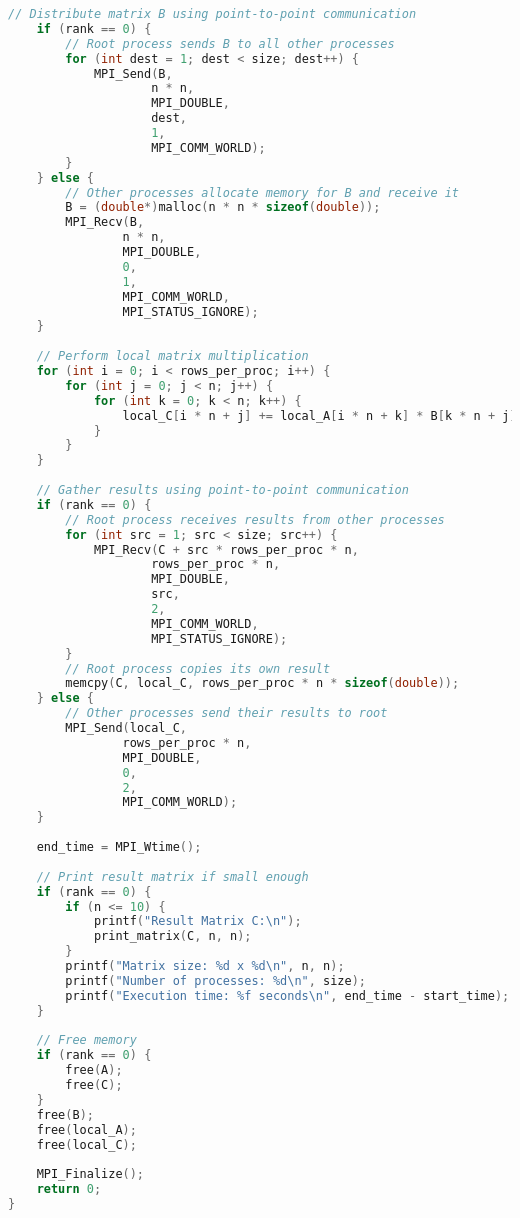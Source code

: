 \documentclass{SYSUReport}
\begin{document}
\begin{lstlisting}[language=C]
    // Distribute matrix B using point-to-point communication
    if (rank == 0) {
        // Root process sends B to all other processes
        for (int dest = 1; dest < size; dest++) {
            MPI_Send(B, 
                    n * n, 
                    MPI_DOUBLE, 
                    dest, 
                    1, 
                    MPI_COMM_WORLD);
        }
    } else {
        // Other processes allocate memory for B and receive it
        B = (double*)malloc(n * n * sizeof(double));
        MPI_Recv(B, 
                n * n, 
                MPI_DOUBLE, 
                0, 
                1, 
                MPI_COMM_WORLD, 
                MPI_STATUS_IGNORE);
    }
    
    // Perform local matrix multiplication
    for (int i = 0; i < rows_per_proc; i++) {
        for (int j = 0; j < n; j++) {
            for (int k = 0; k < n; k++) {
                local_C[i * n + j] += local_A[i * n + k] * B[k * n + j];
            }
        }
    }
    
    // Gather results using point-to-point communication
    if (rank == 0) {
        // Root process receives results from other processes
        for (int src = 1; src < size; src++) {
            MPI_Recv(C + src * rows_per_proc * n, 
                    rows_per_proc * n, 
                    MPI_DOUBLE, 
                    src, 
                    2, 
                    MPI_COMM_WORLD, 
                    MPI_STATUS_IGNORE);
        }
        // Root process copies its own result
        memcpy(C, local_C, rows_per_proc * n * sizeof(double));
    } else {
        // Other processes send their results to root
        MPI_Send(local_C, 
                rows_per_proc * n, 
                MPI_DOUBLE, 
                0, 
                2, 
                MPI_COMM_WORLD);
    }
    
    end_time = MPI_Wtime();
    
    // Print result matrix if small enough
    if (rank == 0) {
        if (n <= 10) {
            printf("Result Matrix C:\n");
            print_matrix(C, n, n);
        }
        printf("Matrix size: %d x %d\n", n, n);
        printf("Number of processes: %d\n", size);
        printf("Execution time: %f seconds\n", end_time - start_time);
    }
    
    // Free memory
    if (rank == 0) {
        free(A);
        free(C);
    }
    free(B);
    free(local_A);
    free(local_C);
    
    MPI_Finalize();
    return 0;
}
\end{lstlisting}
\end{document}
